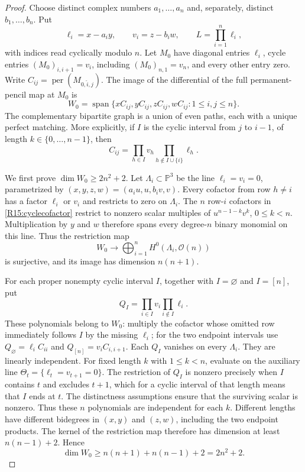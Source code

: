 \documentclass[11pt,a4paper]{article}
\theoremstyle{definition}\newtheorem{definition}{Definition}
\begin{document}
\begin{proof}
Choose distinct complex numbers $a_1,\ldots,a_n$ and, separately,
distinct $b_1,\ldots,b_n$. Put
\[
 \ell_i=x-a_i y,\qquad v_i=z-b_i w,
 \qquad L=\prod_{i=1}^n\ell_i,
\]
with indices read cyclically modulo $n$.
Let $M_0$ have diagonal entries $\ell_i$, cycle entries
$(M_0)_{i,i+1}=v_i$, including $(M_0)_{n,1}=v_n$, and every
other entry zero. Write
$C_{ij}=\operatorname{per}(M_{0,\widehat i,\widehat j})$.
The image of the differential of the full permanent-pencil map
at $M_0$ is
\[
 W_0=\operatorname{span}\{xC_{ij},yC_{ij},zC_{ij},wC_{ij}:1\leq i,j\leq n\}.
\]
The complementary bipartite graph is a union of even paths,
each with a unique perfect matching. More explicitly, if $I$
is the cyclic interval from $j$ to $i-1$, of length
$k\in\{0,\ldots,n-1\}$, then
\begin{equation}\label{R15:cyclecofactor}
 C_{ij}=\prod_{h\in I}v_h
        \prod_{h\notin I\cup\{i\}}\ell_h.
\end{equation}

We first prove $\dim W_0\geq2n^2+2$.
Let $\Lambda_i\subset\mathbb P^3$ be the line
$\ell_i=v_i=0$, parametrized by
$(x,y,z,w)=(a_i u,u,b_i v,v)$.
Every cofactor from row $h\ne i$ has a factor $\ell_i$ or $v_i$
and restricts to zero on $\Lambda_i$.
The $n$ row-$i$ cofactors in \eqref{R15:cyclecofactor} restrict
to nonzero scalar multiples of
$u^{n-1-k}v^k$, $0\leq k<n$.
Multiplication by $y$ and $w$ therefore spans every degree-$n$
binary monomial on this line. Thus the restriction map
\[
 W_0\longrightarrow\bigoplus_{i=1}^n H^0(\Lambda_i,\mathcal O(n))
\]
is surjective, and its image has dimension $n(n+1)$.

For each proper nonempty cyclic interval $I$, together with
$I=\varnothing$ and $I=[n]$, put
\[
 Q_I=\prod_{i\in I}v_i\prod_{i\notin I}\ell_i.
\]
These polynomials belong to $W_0$: multiply the cofactor whose
omitted row immediately follows $I$ by the missing $\ell_i$;
for the two endpoint intervals use
$Q_\varnothing=\ell_iC_{ii}$ and
$Q_{[n]}=v_iC_{i,i+1}$.
Each $Q_I$ vanishes on every $\Lambda_i$.
They are linearly independent. For fixed length $k$ with
$1\leq k<n$, evaluate on the auxiliary line
$\Theta_t=\{\ell_t=v_{t+1}=0\}$.
The restriction of $Q_I$ is nonzero precisely when $I$ contains
$t$ and excludes $t+1$, which for a cyclic interval of that
length means that $I$ ends at $t$. The distinctness assumptions
ensure that the surviving scalar is nonzero. Thus these $n$
polynomials are independent for each $k$. Different lengths have
different bidegrees in $(x,y)$ and $(z,w)$, including the two
endpoint products. The kernel of the restriction map therefore
has dimension at least $n(n-1)+2$. Hence
\begin{equation}\label{R15:baserank}
 \dim W_0\geq n(n+1)+n(n-1)+2=2n^2+2.
\end{equation}


\end{proof}
\end{document}
